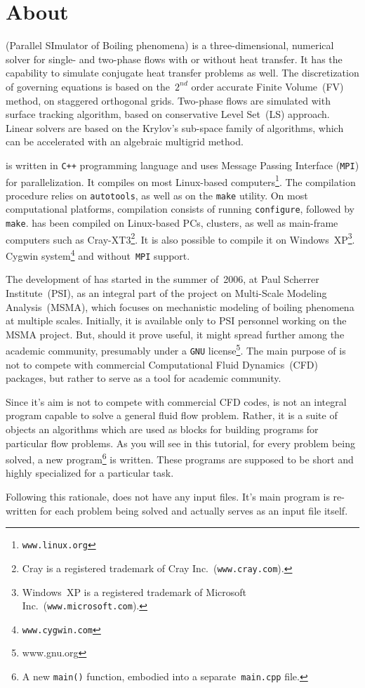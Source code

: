 \section{About {\psiboil}}
\label{sec_about}

{\psiboil} ({\sf P}arallel {\sf SI}mulator of {\sf Boil}ing phenomena) is a
three-dimensional, numerical solver for single- and two-phase flows 
with or without heat transfer. It has the capability to simulate conjugate 
heat transfer problems as well. The discretization of governing equations is
based on the~$2^{nd}$ order accurate Finite Volume~(FV) method,
on staggered orthogonal grids. %
%
Two-phase flows are simulated with surface tracking algorithm,
based on conservative Level Set~(LS) approach. %
%
Linear solvers are based on the Krylov's sub-space family of algorithms,
which can be accelerated with an algebraic multigrid method. %

{\psiboil} is written in {\tt C++} programming language and uses Message
Passing Interface ({\tt MPI}) for parallelization. It compiles on most
Linux-based computers\footnote{\tt www.linux.org}. 
The compilation procedure relies on {\tt autotools},
as well as on the {\tt make} utility. On most computational platforms, 
compilation consists of running {\tt configure}, followed by {\tt make}. 
%
{\psiboil} has been compiled on Linux-based PCs, clusters, as
well as main-frame computers such as Cray-XT3\footnote{Cray is
a registered trademark of Cray Inc.\ ({\tt www.cray.com}).}.
It is also possible to compile it on Windows~XP\footnote{Windows~XP
is a registered trademark of Microsoft Inc.\ ({\tt www.microsoft.com}).}.
Cygwin system\footnote{\tt www.cygwin.com} and without~{\tt MPI}
support.

The development of {\psiboil} has started in the summer of~2006,
at Paul Scherrer Institute~(PSI), as an integral part of the project
on Multi-Scale Modeling Analysis~(MSMA), which focuses on mechanistic
modeling of boiling phenomena at multiple scales. Initially, it is
available only to PSI personnel working on the MSMA project. But, should
it prove useful, it might spread further among the academic
community, presumably under a {\tt GNU} license\footnote{www.gnu.org}.
%
The main purpose of {\psiboil} is not to compete with commercial
Computational Fluid Dynamics~(CFD) packages, but rather to serve
as a tool for academic community.

Since it's aim is not to compete with commercial CFD codes, {\psiboil} 
is not an integral program capable to solve a general fluid
flow problem. Rather, it is a suite of objects an algorithms 
which are used as blocks for building programs for particular flow problems. 
As you will see in this tutorial, for every problem being solved, 
a new program\footnote{A new {\tt main()} function, embodied into a
separate~{\tt main.cpp} file.} is written. These programs are supposed
to be short and highly specialized for a particular task. 

Following this rationale, {\psiboil} does not have any input files. 
It's  main program is re-written for each problem being solved and 
actually serves as an input file itself.  
